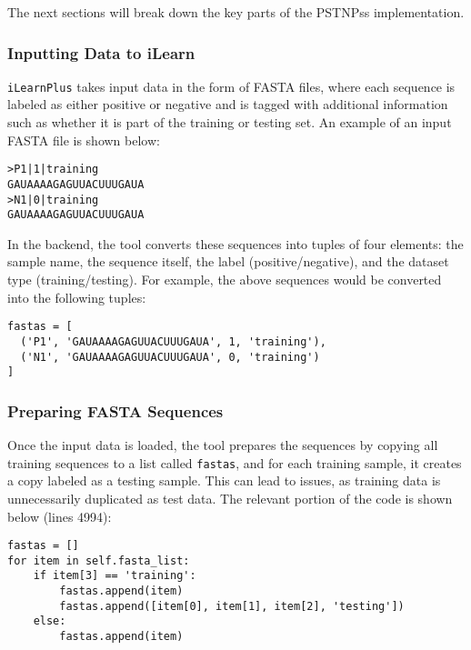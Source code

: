     The next sections will break down the key parts of the PSTNPss implementation.

    \subsubsection*{Inputting Data to iLearn}
      \texttt{iLearnPlus} takes input data in the form of FASTA files, where each sequence is labeled as either positive or negative and is tagged with additional information such as whether it is part of the training or testing set.
      An example of an input FASTA file is shown below:

      \begin{verbatim}
>P1|1|training
GAUAAAAGAGUUACUUUGAUA
>N1|0|training
GAUAAAAGAGUUACUUUGAUA
      \end{verbatim}

      In the backend, the tool converts these sequences into tuples of four elements: the sample name, the sequence itself, the label (positive/negative), and the dataset type (training/testing).
      For example, the above sequences would be converted into the following tuples:

      \begin{verbatim}
fastas = [
  ('P1', 'GAUAAAAGAGUUACUUUGAUA', 1, 'training'),
  ('N1', 'GAUAAAAGAGUUACUUUGAUA', 0, 'training')
]
      \end{verbatim}

    \subsubsection*{Preparing FASTA Sequences}

      Once the input data is loaded, the tool prepares the sequences by copying all training sequences to a list called \texttt{fastas}, and for each training sample, it creates a copy labeled as a testing sample.
      This can lead to issues, as training data is unnecessarily duplicated as test data.
      The relevant portion of the code is shown below (lines 4994):

      \begin{lstlisting}[caption={Copying Tuples into \texttt{fastas} List},label={lst:copy-tuples}]
fastas = []
for item in self.fasta_list:
    if item[3] == 'training':
        fastas.append(item)
        fastas.append([item[0], item[1], item[2], 'testing'])
    else:
        fastas.append(item)
      \end{lstlisting}

